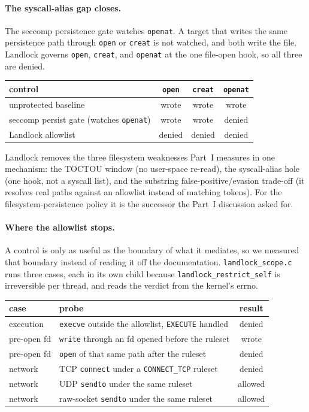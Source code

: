 \documentclass[11pt]{article}
\begin{document}
\paragraph{The syscall-alias gap closes.} The seccomp persistence gate watches \texttt{openat}. A target
that writes the same persistence path through \texttt{open} or \texttt{creat} is not watched, and both
write the file. Landlock governs \texttt{open}, \texttt{creat}, and \texttt{openat} at the one file-open
hook, so all three are denied.

\begin{center}
\begin{tabular}{lccc}
\toprule
control & \texttt{open} & \texttt{creat} & \texttt{openat} \\
\midrule
unprotected baseline & wrote & wrote & wrote \\
seccomp persist gate (watches \texttt{openat}) & wrote & wrote & denied \\
Landlock allowlist & denied & denied & denied \\
\bottomrule
\end{tabular}
\end{center}

Landlock removes the three filesystem weaknesses Part~I measures in one mechanism: the TOCTOU window (no
user-space re-read), the syscall-alias hole (one hook, not a syscall list), and the substring
false-positive/evasion trade-off (it resolves real paths against an allowlist instead of matching tokens).
For the filesystem-persistence policy it is the successor the Part~I discussion asked for.

\paragraph{Where the allowlist stops.} A control is only as useful as the boundary of what it
mediates, so we measured that boundary instead of reading it off the documentation.
\texttt{landlock\_scope.c} runs three cases, each in its own child because
\texttt{landlock\_restrict\_self} is irreversible per thread, and reads the verdict from the kernel's
errno.

\begin{center}
\begin{tabular}{llc}
\toprule
case & probe & result \\
\midrule
execution & \texttt{execve} outside the allowlist, \texttt{EXECUTE} handled & denied \\
pre-open fd & \texttt{write} through an fd opened before the ruleset & wrote \\
pre-open fd & \texttt{open} of that same path after the ruleset & denied \\
network & TCP \texttt{connect} under a \texttt{CONNECT\_TCP} ruleset & denied \\
network & UDP \texttt{sendto} under the same ruleset & allowed \\
network & raw-socket \texttt{sendto} under the same ruleset & allowed \\
\bottomrule
\end{tabular}
\end{center}
\end{document}
